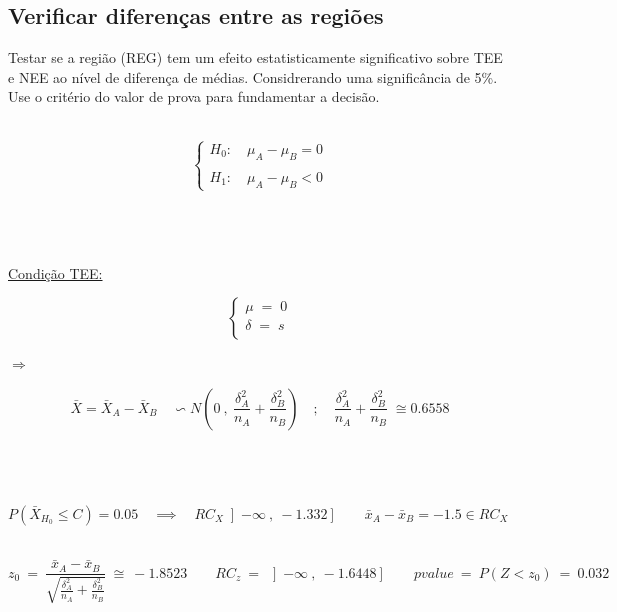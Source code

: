 \subsection{Verificar diferenças entre as regiões}
\noindent
Testar se a região (REG) tem um efeito estatisticamente significativo sobre TEE e NEE ao nível de diferença de médias. Considrerando uma significância de 5\%. Use o critério do valor de prova para fundamentar a decisão.\\
\\
\begin{minipage}[l]{0pt}
$$\left\lbrace\begin{array}{l}
H_0: \quad \mu_A-\mu_B=0 \\
\\
H_1: \quad \mu_A-\mu_B<0
\end{array}\right.$$
\end{minipage}
\\
\\
\\
\hspace*{5cm} \underline{Condição TEE:}\\
\begin{minipage}[l]{0pt}
$$\left\lbrace\begin{array}{c}
\mu \;=\; 0 \\
\delta \;=\; s \\
\end{array}\right.$$
\end{minipage}
\hspace{3cm} $\Longrightarrow$ \hspace{1cm}
\begin{minipage}[l]{0pt}
\[\bar{X}=\bar{X}_A-\bar{X}_B \quad \backsim N \left( 0\:,\: \frac{\delta_A^2}{n_A}+\frac{\delta_B^2}{n_B} \right) \quad ; \quad \frac{\delta_A^2}{n_A}+\frac{\delta_B^2}{n_B}\;\cong0.6558 \]
\end{minipage}\\
\\
\\
$P(\bar{X}_{H_0} \leqslant C)=0.05 \quad \implies \quad RC_X\left] -\infty \:,\: -1.332 \right] \qquad \bar{x}_A-\bar{x}_B=-1.5 \in RC_X $ \\
\\
\begin{minipage}[l]{0pt}
\[  z_0\:=\: \frac{\bar{x}_A-\bar{x}_B}{\sqrt{\frac{\delta_A^2}{n_A}+\frac{\delta_B^2}{n_B}}}\:\cong\: -1.8523 \qquad
	RC_z \:=\: \left] -\infty \:,\: -1.6448 \right]  \qquad
	pvalue \:=\: P(Z<z_0) \:=\: 0.032 \]
\end{minipage}\\
